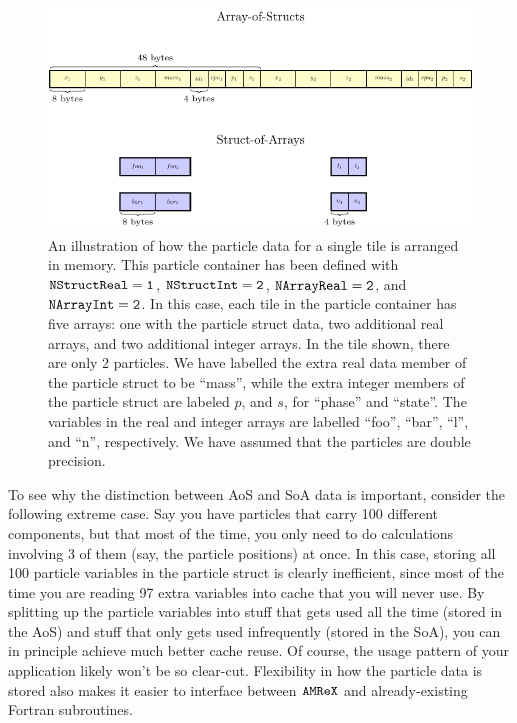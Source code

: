 \begin{figure}
  \centering
  \includegraphics[width=\textwidth]{./Particle/particle_arrays.pdf}
  \caption{\label{fig:particles:particle_arrays} An illustration of how the particle data for a single tile is arranged in memory. This particle container has been defined with $\tt{NStructReal} = 1$, $\tt{NStructInt} = 2$, $\tt{NArrayReal} = 2$, and $\tt{NArrayInt} = 2$. In this case, each tile in the particle container has five arrays: one with the particle struct data, two additional real arrays, and two additional integer arrays. In the tile shown, there are only 2 particles. We have labelled the extra real data member of the particle struct to be ``mass'', while the extra integer members of the particle struct are labeled $p$, and $s$, for ``phase'' and ``state''. The variables in the real and integer arrays are labelled ``foo'', ``bar'', ``l'', and ``n'', respectively. We have assumed that the particles are double precision.}
\end{figure}

To see why the distinction between AoS and SoA data is important, consider the following extreme case. Say you have particles that carry 100 different components,
but that most of the time, you only need to do calculations involving 3 of them (say, the particle positions) at once. In this case, storing all 100 particle variables in the particle
struct is clearly inefficient, since most of the time you are reading 97 extra variables into cache that you will never use. By splitting up the particle variables into stuff that gets 
used all the time (stored in the AoS) and stuff that only gets used infrequently (stored in the SoA), you can in principle achieve much better cache reuse. Of course, the usage pattern of your application likely won't be so clear-cut. Flexibility in how the particle data is stored also makes it easier to interface between $\tt{AMReX}$ and already-existing Fortran subroutines.


